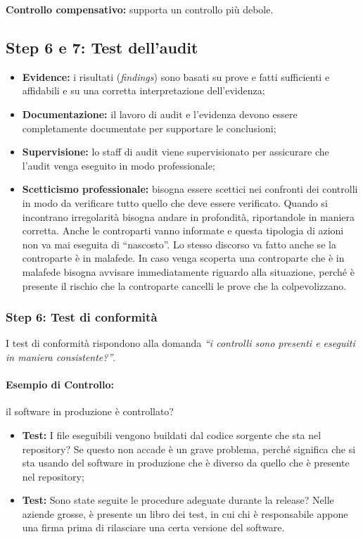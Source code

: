 \textbf{Controllo compensativo:} supporta un controllo più debole.

\subsection{Step 6 e 7: Test dell'audit}

\begin{itemize}
\item \textbf{Evidence:} i risultati (\emph{findings}) sono basati su prove e
fatti sufficienti e affidabili e su una corretta interpretazione dell'evidenza;

\item \textbf{Documentazione:} il lavoro di audit e l'evidenza
devono essere completamente documentate per supportare le conclusioni;

\item \textbf{Supervisione:} lo staff di audit viene supervisionato per
assicurare che l'audit venga eseguito in modo professionale;

\item \textbf{Scetticismo professionale:} bisogna essere scettici nei confronti
dei controlli in modo da verificare tutto quello che deve essere verificato.
Quando si incontrano irregolarità bisogna andare in profondità, riportandole
in maniera corretta. Anche le controparti vanno informate e questa tipologia di
azioni non va mai eseguita di ``nascosto''. Lo stesso discorso va fatto anche
se la controparte è in malafede. In caso venga scoperta una controparte che è in
malafede bisogna avvisare immediatamente riguardo alla situazione, perché è
presente il rischio che la controparte cancelli le prove che la colpevolizzano.
\end{itemize}






\subsubsection{Step 6: Test di conformità}
I test di conformità rispondono alla domanda \textit{
``i controlli sono presenti e eseguiti in maniera consistente?''}.

\paragraph*{Esempio di Controllo:} il software in produzione è controllato?
\begin{itemize}
\item \textbf{Test:} I file eseguibili vengono buildati dal codice sorgente che
sta nel repository? Se questo non accade è un grave problema, perché significa
che si sta usando del software in produzione che è diverso da quello che è
presente nel repository;
\item \textbf{Test:} Sono state seguite le procedure adeguate durante la
release? Nelle aziende grosse, è presente un libro dei test, in cui chi è
responsabile appone una firma prima di rilasciare una certa versione del
software.
\end{itemize}


